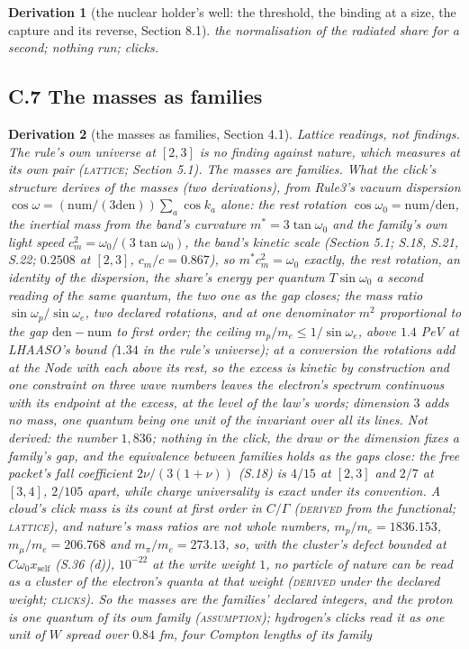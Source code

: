 \documentclass[pdflatex,sn-mathphys-num]{sn-jnl}
\newcommand{\num}{\mathrm{num}}
\newcommand{\den}{\mathrm{den}}
\newcommand{\claimmark}[1]{\textup{\textsc{#1}}}
\newcommand{\fence}[1]{\textup{\textsc{#1}}}
\theoremstyle{thmstyleone}
\newtheorem{derivation}{Derivation}
\renewcommand{\thederivation}{S.\arabic{derivation}}
\begin{document}
\begin{derivation}[the nuclear holder's well: the threshold, the binding at a size, the capture and its reverse, Section 8.1]
the normalisation of the radiated share for a second; nothing run; clicks.
\end{derivation}

\subsection*{C.7 The masses as families}

\renewcommand{\thederivation}{C.\arabic{derivation}}\setcounter{derivation}{6}
\begin{derivation}[the masses as families, Section 4.1]
\emph{Lattice readings, not findings.} The rule's own universe at $[2, 3]$ is no finding against nature, which measures at its own pair (\fence{lattice}; Section 5.1). The masses are families. \emph{What the click's structure derives of the masses} (two derivations), from Rule3's vacuum dispersion $\cos\omega = (\num / (3\den)) \sum_a \cos k_a$ alone: the rest rotation $\cos\omega_0 = \num / \den$, the inertial mass from the band's curvature $m^* = 3\tan\omega_0$ and the family's own light speed $c_m^2 = \omega_0 / (3\tan\omega_0)$, the band's kinetic scale (Section 5.1; S.18, S.21, S.22; $0.2508$ at $[2, 3]$, $c_m / c = 0.867$), so $m^* c_m^2 = \omega_0$ exactly, the rest rotation, an identity of the dispersion, the share's energy per quantum $T\sin\omega_0$ a second reading of the same quantum, the two one as the gap closes; the mass ratio $\sin\omega_p / \sin\omega_e$, two declared rotations, and at one denominator $m^2$ proportional to the gap $\den - \num$ to first order; the ceiling $m_p / m_e \le 1 / \sin\omega_e$, above $1.4$ PeV at LHAASO's bound ($1.34$ in the rule's universe); at a conversion the rotations add at the Node with each above its rest, so the excess is kinetic by construction and one constraint on three wave numbers leaves the electron's spectrum continuous with its endpoint at the excess, at the level of the law's words; dimension $3$ adds no mass, one quantum being one unit of the invariant over all its lines. Not derived: the number $1{,}836$; nothing in the click, the draw or the dimension fixes a family's gap, and the equivalence between families holds as the gaps close: the free packet's fall coefficient $2\nu / (3(1 + \nu))$ (S.18) is $4 / 15$ at $[2, 3]$ and $2 / 7$ at $[3, 4]$, $2 / 105$ apart, while charge universality is exact under its convention. A cloud's click mass is its count at first order in $C / \Gamma$ (\claimmark{derived} from the functional; \fence{lattice}), and nature's mass ratios are not whole numbers, $m_p / m_e = 1836.153$, $m_\mu / m_e = 206.768$ and $m_\pi / m_e = 273.13$, so, with the cluster's defect bounded at $C\omega_0 x_{\mathrm{self}}$ (S.36 (d)), $10^{-22}$ at the write weight $1$, no particle of nature can be read as a cluster of the electron's quanta at that weight (\claimmark{derived} under the declared weight; \fence{clicks}). So the masses are the families' declared integers, and the proton is one quantum of its own family (\claimmark{assumption}); hydrogen's clicks read it as one unit of $W$ spread over $0.84$ fm, four Compton lengths of its family 
\end{derivation}
\end{document}
